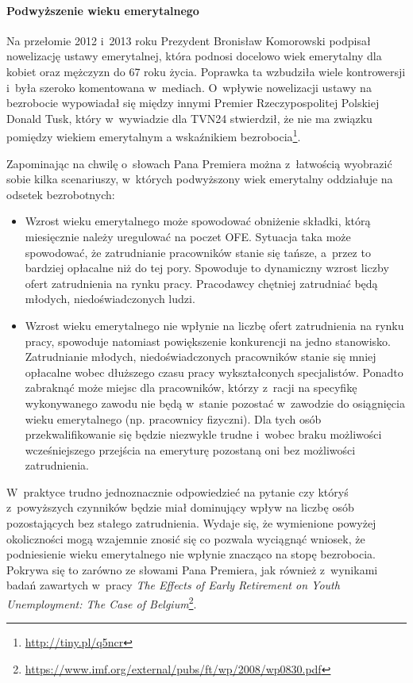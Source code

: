 \documentclass[12pt]{article}
\begin{document}
    \paragraph{Podwyższenie wieku emerytalnego}
    
    Na przełomie 2012 i~2013 roku Prezydent Bronisław Komorowski podpisał nowelizację ustawy emerytalnej, która podnosi docelowo wiek emerytalny dla kobiet oraz mężczyzn do 67 roku życia. Poprawka ta wzbudziła wiele kontrowersji i~była szeroko komentowana w~mediach. O~wpływie nowelizacji ustawy na bezrobocie wypowiadał się między innymi Premier Rzeczypospolitej Polskiej Donald Tusk, który w~wywiadzie dla TVN24 stwierdził, że nie ma związku pomiędzy wiekiem emerytalnym a wskaźnikiem bezrobocia\footnote{\url{http://tiny.pl/q5ncr}}.
    
    Zapominając na chwilę o~słowach Pana Premiera można z~łatwością wyobrazić sobie kilka scenariuszy, w~których podwyższony wiek emerytalny oddziałuje na odsetek bezrobotnych:
    
    \begin{itemize}
        \item Wzrost wieku emerytalnego może spowodować obniżenie składki, którą miesięcznie należy uregulować na poczet OFE. Sytuacja taka może spowodować, że zatrudnianie pracowników stanie się tańsze, a~przez to bardziej opłacalne niż do tej pory. Spowoduje to dynamiczny wzrost liczby ofert zatrudnienia na rynku pracy. Pracodawcy chętniej zatrudniać będą młodych, niedoświadczonych ludzi.
        \item Wzrost wieku emerytalnego nie wpłynie na liczbę ofert zatrudnienia na rynku pracy, spowoduje natomiast powiększenie konkurencji na jedno stanowisko. Zatrudnianie młodych, niedoświadczonych pracowników stanie się mniej opłacalne wobec dłuższego czasu pracy wykształconych specjalistów. Ponadto zabraknąć może miejsc dla pracowników, którzy z~racji na specyfikę wykonywanego zawodu nie będą w~stanie pozostać w~zawodzie do osiągnięcia wieku emerytalnego (np. pracownicy fizyczni). Dla tych osób przekwalifikowanie się będzie niezwykle trudne i~wobec braku możliwości wcześniejszego przejścia na emeryturę pozostaną oni bez możliwości zatrudnienia. 
    \end{itemize}
 
    W~praktyce trudno jednoznacznie odpowiedzieć na pytanie czy któryś z~powyższych czynników będzie miał dominujący wpływ na liczbę osób pozostających bez stałego zatrudnienia. Wydaje się, że wymienione powyżej okoliczności mogą wzajemnie znosić się co pozwala wyciągnąć wniosek, że podniesienie wieku emerytalnego nie wpłynie znacząco na stopę bezrobocia. Pokrywa się to zarówno ze słowami Pana Premiera, jak również z~wynikami badań zawartych w~pracy \emph{The Effects of Early Retirement on Youth Unemployment: The Case of Belgium}\footnote{\url{https://www.imf.org/external/pubs/ft/wp/2008/wp0830.pdf}}.
    
\end{document}

